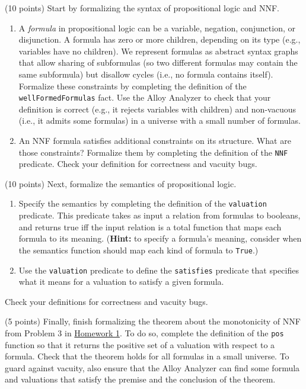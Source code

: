 \documentclass{handout}
\begin{document}
\begin{questions}
\item \label{prob:alloy:first} (10 points) Start by formalizing the syntax of propositional logic and NNF.
\begin{enumerate}
\item A \emph{formula} in propositional logic can be a variable, negation,
conjunction, or disjunction. A formula has zero or more children, depending on
its type (e.g., variables have no children).  We represent formulas as abstract
syntax graphs that allow sharing of subformulas (so two different formulas may
contain the same subformula) but disallow cycles (i.e., no formula contains
itself). Formalize these constraints by completing the definition of the
\texttt{wellFormedFormulas} fact. Use the Alloy Analyzer to check that your
definition is correct (e.g., it rejects variables with children) and non-vacuous
(i.e., it admits some formulas) in a universe with a small number of formulas.

\item An NNF formula satisfies additional constraints on its structure.  What
are those constraints?     Formalize them by completing the definition of the
\texttt{NNF} predicate.  Check your definition for correctness and vacuity bugs.


\end{enumerate}

\item (10 points) Next, formalize the semantics of propositional logic.
\begin{enumerate}
\item Specify the semantics by completing the definition of the
\texttt{valuation} predicate. This predicate takes as input a relation from
formulas to booleans, and returns true iff the input relation is a total
function that maps each formula to its meaning. (\textbf{Hint:} to specify a
formula's meaning, consider when the semantics function should map each kind of
formula to \texttt{True}.)

\item Use the \texttt{valuation} predicate to define the \texttt{satisfies}
predicate that specifies what it means for a valuation to satisfy a given
formula.
\end{enumerate}
Check your definitions for correctness and vacuity bugs.


\item (5 points) \label{prob:alloy:last} Finally, finish formalizing the theorem
about the monotonicity of NNF from Problem 3 in
\href{\website/doc/hw1.pdf}{Homework 1}. To do so, complete the definition of
the \texttt{pos} function so that it returns the positive  set of a valuation
with respect to a formula. Check that the theorem holds for all formulas in a
small universe. To guard against vacuity, also ensure that the Alloy Analyzer
can find some formula and valuations that satisfy the premise and the
conclusion of the theorem.

\end{questions}
\end{document}
